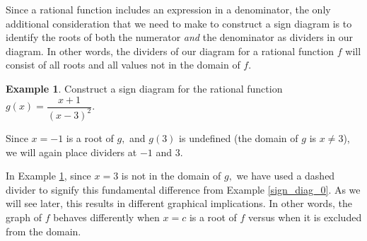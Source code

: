 \documentclass[12pt]{book}
\theoremstyle{definition}
\newtheorem{example}{Example}
\begin{document}
Since a rational function includes an expression in a denominator, the only additional consideration that we need to make to construct a sign diagram is to identify the roots of both the numerator {\it and} the denominator as dividers in our diagram.  In other words, the dividers of our diagram for a rational function $f$ will consist of all roots and all values not in the domain of $f$.
\begin{example}\label{sign_diag_1}
Construct a sign diagram for the rational function $g(x)=\dfrac{x+1}{(x-3)^2}$.
\par
Since $x=-1$ is a root of $g,$ and $g(3)$ is undefined (the domain of $g$ is $x\neq 3$), we will again place dividers at $-1$ and $3$.
\begin{center}
\end{center}
\end{example}
In Example \ref{sign_diag_1}, since $x=3$ is not in the domain of $g,$ we have used a dashed divider to signify this fundamental difference from Example \ref{sign_diag_0}.  As we will see later, this results in different graphical implications.  In other words, the graph of $f$ behaves differently when $x=c$ is a root of $f$ versus when it is excluded from the domain.
\end{document}
